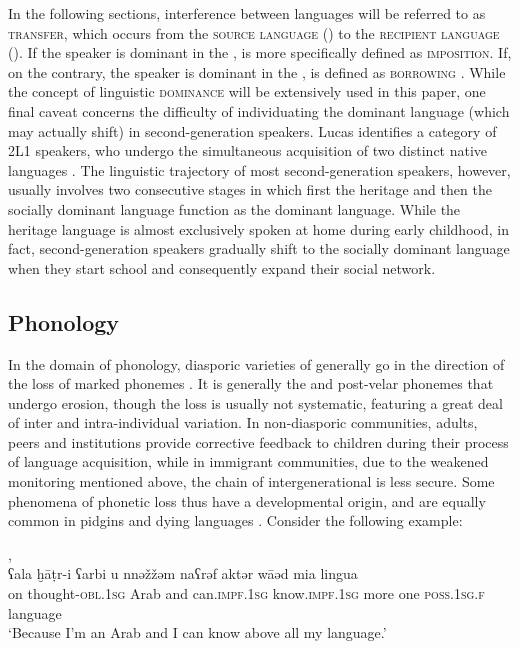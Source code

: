 \documentclass[output=paper]{langsci/langscibook}
\begin{document}
In the following sections, interference between languages will be referred to as \textsc{transfer}, which occurs from the \textsc{source} \textsc{language} () to the \textsc{recipient} \textsc{language} (). If the speaker is dominant in the ,  is more specifically defined as \textsc{imposition}. If, on the contrary, the speaker is dominant in the ,  is defined as \textsc{borrowing} \citep{VanCoetsem1988, VanCoetsem2000,Lucas2015}. While the concept of linguistic \textsc{dominance} will be extensively used in this paper, one final caveat concerns the difficulty of individuating the dominant language (which may actually shift) in second-generation speakers. Lucas identifies a category of 2L1 speakers, who undergo the simultaneous acquisition of two distinct native languages \citep[525]{Lucas2015}. The linguistic trajectory of most second-generation speakers, however, usually involves two consecutive stages in which first the heritage and then the socially dominant language function as the dominant language. While the heritage language is almost exclusively spoken at home during early childhood, in fact, second-generation speakers gradually shift to the socially dominant language when they start school and consequently expand their social network.


 
 \subsection{Phonology}


In the domain of phonology, diasporic varieties of  generally go in the direction of the loss of marked phonemes \citep[293]{Versteegh2014book}. It is generally the  and post-velar phonemes that undergo erosion, though the loss is usually not systematic, featuring a great deal of inter and intra-individual variation. In non-diasporic communities, adults, peers and institutions provide corrective feedback to children during their process of language acquisition, while in immigrant communities, due to the weakened monitoring mentioned above, the chain of intergenerational  is less secure. Some phenomena of phonetic loss thus have a developmental origin, and are equally common in pidgins and dying languages \citep[372–373]{Romaine1989}. Consider the following example:

\ea\label{ex:key:maz}
{ ,  \citep[85]{Danna2017book}}\\
\gll ʕala ḫāṭr-i ʕarbi u nnəžžəm naʕrəf aktər wāəd mia lingua\\
     on thought-\textsc{obl.1sg} Arab and can.\textsc{impf.1sg} know.\textsc{impf.1sg} more one \textsc{poss.1sg.f} language\\
\glt `Because I’m an Arab and I can know above all my language.'
\z
\end{document}
